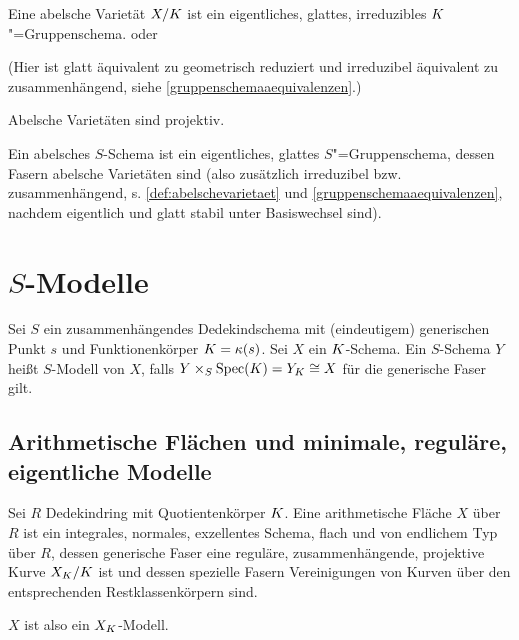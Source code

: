 \documentclass[german]{scrreprt}
\begin{document}
\begin{Definition}\label{def:abelschevarietaet}
Eine abelsche Varietät $X/K$ ist ein eigentliches, glattes,
irreduzibles $K$"=Gruppenschema.
\cite[9.6, Definition 1]{bosch} oder \cite[Definition 16.52]{wedhorn}

(Hier ist glatt äquivalent zu geometrisch reduziert und irreduzibel
äquivalent zu zusammenhängend, 
siehe \ref{gruppenschemaaequivalenzen}.)

\begin{Bemerkung}\label{thm:abvarietaetprojektiv}
Abelsche Varietäten sind projektiv.
\cite[9.6, Proposition 4]{bosch}
\end{Bemerkung}
\end{Definition}

\begin{Definition}
Ein abelsches $S$-Schema ist ein eigentliches, glattes $S$"=Gruppenschema,
dessen Fasern abelsche Varietäten sind 
(also zusätzlich irreduzibel bzw. zusammenhängend,
s. \ref{def:abelschevarietaet} und \ref{gruppenschemaaequivalenzen},
nachdem eigentlich und glatt stabil unter Basiswechsel sind).
\end{Definition}


\chapter{$S$-Modelle}
\begin{Definition}[$S$-Modell]
  Sei $S$ ein zusammenhängendes Dedekindschema mit (eindeutigem)
  generischen Punkt $s$ und Funktionenkörper $K=\kappa(s)$.
  Sei $X$ ein $K$-Schema.
  Ein $S$-Schema $Y$ heißt $S$-Modell von $X$, falls
  $Y\times_S\operatorname{Spec}(K)=Y_K\cong X$ für die generische Faser gilt.
\end{Definition}


\section{Arithmetische Flächen und minimale, reguläre, eigentliche Modelle}
\begin{Definition}
  Sei $R$ Dedekindring mit Quotientenkörper $K$.
  Eine arithmetische Fläche $X$ über $R$ ist ein
  integrales, normales, exzellentes Schema, flach und von endlichem
  Typ über $R$,
  dessen generische Faser eine reguläre, zusammenhängende,
  projektive Kurve $X_{K}/K$ ist
  und dessen spezielle Fasern Vereinigungen von Kurven über den
  entsprechenden Restklassenkörpern sind.
  \cite[IV.4]{silverman2}
  
  $X$ ist also ein $X_{K}$-Modell.
\end{Definition}
\end{document}
